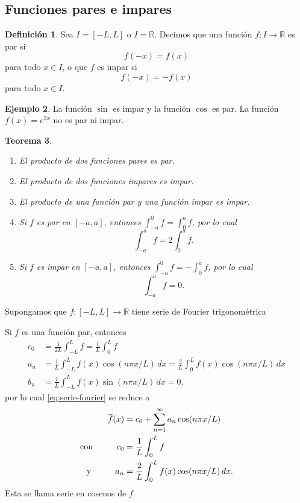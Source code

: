 \documentclass[11pt,letterpaper,draft]{report}
\theoremstyle{plain}
\newtheorem{theorem}{Teorema}[chapter]
\theoremstyle{definition}
\newtheorem{definition}[theorem]{Definición}
\newtheorem{example}[theorem]{Ejemplo}
\theoremstyle{remark}
\newcommand\R{\mathbb R}
\newcommand\<{\langle}
\renewcommand\>{\rangle}
\begin{document}
\newpage
\subsection{Funciones pares e impares}

\begin{definition}
  Sea $I=[-L,L]$ o $I=\R$.
  Decimos que una función $f:I\to\R$ es par si
  \[
    f(-x) = f(x)
  \]
  para todo $x\in I$, o que $f$ es impar si
  \[
    f(-x) = -f(x)
  \]
  para todo $x\in I$.
\end{definition}

\begin{example}
  La función $\sin$ es impar y la función $\cos$ es par.
  La función $f(x)=e^{2x}$ no es par ni impar.
\end{example}

\begin{theorem}
  \begin{enumerate}
    \item El producto de dos funciones pares es par.
    \item El producto de dos funciones impares es impar.
    \item El producto de una función par y una función impar es impar.
    \item Si $f$ es par en $[-a,a]$, entonces
      $\int_{-a}^{0}f=\int_{0}^{a}f$, por lo cual
      \[
        \int_{-a}^{a}f = 2\int_{0}^{a}f
      .\]
    \item Si $f$ es impar en $[-a,a]$, entonces
      $\int_{-a}^{0}f=-\int_{0}^{a}f$, por lo cual
      \[
        \int_{-a}^{a}f = 0
      .\]
  \end{enumerate}
\end{theorem}

Supongamos que $f:[-L,L]\to\R$ tiene serie de Fourier trigonométrica

Si $f$ es una función par, entonces
\begin{align*}
  c_0 &= \frac{1}{2L}\int_{-L}^L f = \frac{1}{L}\int_{0}^L f \\
  a_n
    &= \frac{1}{L}\int_{-L}^L f(x)\cos(n\pi x/L)\,dx
    = \frac{2}{L}\int_{0}^L f(x)\cos(n\pi x/L)\,dx \\
  b_n
    &= \frac{1}{L}\int_{-L}^L f(x)\sin(n\pi x/L)\,dx
    = 0.
\end{align*}
por lo cual \eqref{eq:serie-fourier} se reduce a
\begin{equation}\label{eq:fourier-par}
\begin{aligned}
  \overline{f}(x)
  &=
  c_0
  +
  \sum_{n=1}^{\infty}a_n\cos(n\pi x/L) \\
  \text{con} \hspace{10mm}
  c_0 &= \frac{1}{L}\int_{0}^L f \\
  \text{y} \hspace{10mm}
  a_n &= \frac{2}{L}\int_{0}^L f(x)\cos(n\pi x/L)\,dx.
\end{aligned}
\end{equation}
Esta se llama serie en cosenos de $f$.
\end{document}
